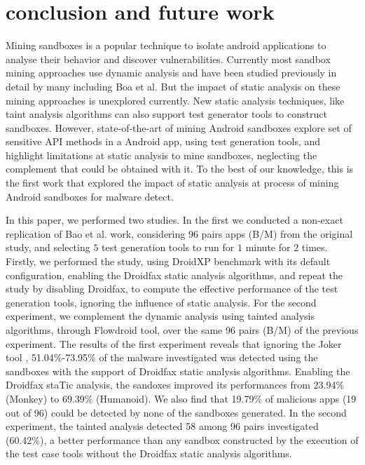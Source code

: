 \section{conclusion and future work}

Mining sandboxes is a popular technique to isolate android applications to analyse their behavior and discover vulnerabilities. Currently most sandbox mining approaches use dynamic analysis and have been studied previously in detail by many including Boa et al. But the impact of static analysis on these mining approaches is unexplored currently. New static analysis techniques, like taint analysis algorithms can also support test generator tools to construct sandboxes.  However, state-of-the-art of mining Android sandboxes explore set of sensitive API methods in a Android app, using test generation tools, and highlight limitations at static analysis to mine sandboxes, neglecting the complement that could be obtained with it. To the best of our knowledge, this is the first work that explored the impact of static analysis at process of mining Android sandboxes for malware detect.

In this paper, we performed two studies. In the first we conducted a non-exact replication of Bao et al. work, considering $96$ pairs apps (B/M) from the original study, and selecting $5$ test generation tools to run for $1$ minute for $2$ times. Firstly, we performed the study, using DroidXP benchmark with its default configuration, enabling the Droidfax static analysis algorithms, and repeat the study by disabling Droidfax, to compute the effective performance of the test generation tools, ignoring the influence of static analysis. For the second experiment, we complement the dynamic analysis using tainted analysis algorithms, through Flowdroid tool, over the same $96$ pairs (B/M) of the previous experiment. The results of the first experiment reveals that ignoring the Joker tool , 51.04\%-73.95\% of the malware investigated was detected using the sandboxes with the support of Droidfax static analysis algorithms. Enabling the Droidfax staTic analysis, the sandoxes improved its performances from 23.94\% (Monkey) to 69.39\% (Humanoid). We also find that 19.79\% of malicious apps (19 out of 96) could be detected by none of the sandboxes generated. In the second experiment, the tainted analysis detected 58 among 96 pairs investigated (60.42\%), a better performance than any sandbox constructed by the execution of the test case tools without the Droidfax static analysis algorithms. 

